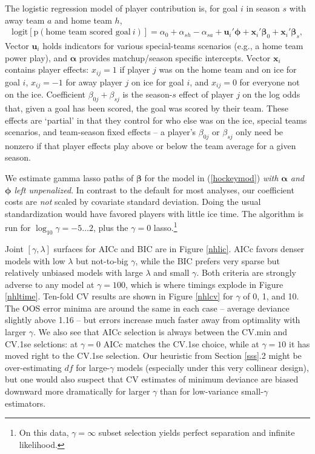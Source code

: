 \documentclass[12pt]{article}
\newcommand{\bs}[1]{\boldsymbol{#1}}
\newcommand{\mr}[1]{\mathrm{#1}}
\newcommand{\bm}[1]{\mathbf{#1}}
\begin{document}
The logistic regression model of player contribution is, for goal $i$ in
season $s$ with away team $a$ and home team $h$,
\begin{align}\label{hockeymod}
\mr{logit}\left[\mr{p}(\text{home~team~scored~goal}~i)\right] = \alpha_0 +
\alpha_{sh} - \alpha_{sa} + \bm{u}_i'\bs{\phi} + \bm{x}_i'\bs{\beta}_0 +
\bm{x}_i'\bs{\beta}_s, \end{align}  Vector $\bm{u}_i$ holds indicators for
various special-teams scenarios (e.g., a home team power play), and
$\bs{\alpha}$ provides matchup/season specific intercepts. Vector $\bm{x}_i$
contains player effects: $x_{ij}=1$ if player $j$ was on the home team and on
ice for goal $i$, $x_{ij}=-1$ for away player $j$ on ice for goal $i$, and
$x_{ij}=0$ for everyone not on the ice.   Coefficient $\beta_{0j} +
\beta_{sj}$ is the season-$s$ effect of player $j$ on the log odds that, given
a goal has been scored, the goal was scored by their team.  These effects are
`partial' in that they control for who else was on the ice, special teams
scenarios, and team-season fixed effects -- a player's $\beta_{0j}$ or $\beta_{sj}$
only need be nonzero if that player effects play above or below the team
average for a given season.

We estimate gamma lasso paths of $\bs{\beta}$ for the model in
(\ref{hockeymod}) {\it with  $\bs{\alpha}$ and $\bs{\phi}$ left unpenalized}.
In contrast to the default for most analyses, our coefficient costs are {\it
not} scaled by covariate standard deviation.  Doing the usual standardization
would have favored players with little ice time.  The algorithm is run for
$\log_{10}\gamma = -5 \ldots 2$, plus the $\gamma=0$ lasso.\footnote{On this
data, $\gamma=\infty$ subset selection yields perfect separation and infinite
likelihood.}

Joint $[\gamma,\lambda]$ surfaces for AICc and BIC are in Figure \ref{nhlic}.
AICc favors denser models with low $\lambda$ but not-to-big $\gamma$,
while the BIC  prefers very sparse but relatively unbiased  models with large
$\lambda$ and small $\gamma$.  Both criteria are strongly adverse to any model
at $\gamma=100$, which is where timings explode in Figure
\ref{nhltime}.  Ten-fold CV results are shown in Figure
\ref{nhlcv} for $\gamma$ of 0, 1, and 10.  The OOS error minima are around the
same in each case -- average deviance slightly above 1.16 -- but errors
increase much faster away from optimality with larger $\gamma$.   We also see
that AICc selection is always between the CV.min and CV.1se selctions:  at
$\gamma=0$ AICc matches the CV.1se choice, while at $\gamma=10$ it has moved
right to the CV.1se  selection.  Our heuristic from Section \ref{sss}.2 might be
over-estimating $df$ for large-$\gamma$ models (especially under this very
collinear design), but one would also suspect that CV estimates of minimum
deviance are biased downward more dramatically for larger $\gamma$ than for
low-variance small-$\gamma$ estimators.
\end{document}
